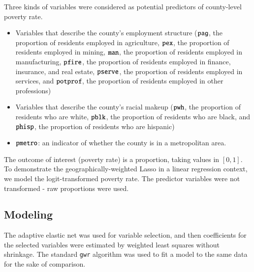 \documentclass[authoryear, review, 11pt]{elsarticle}
\begin{document}
	Three kinds of variables  were considered as potential predictors of county-level poverty rate.
	\begin{itemize}
		\item Variables that describe the county's employment structure ($\verb!pag!$, the proportion of residents employed in agriculture, $\verb!pex!$, the proportion of residents employed in mining, $\verb!man!$, the proportion of residents employed in manufacturing, $\verb!pfire!$, the proportion of residents employed in finance, insurance, and real estate, $\verb!pserve!$, the proportion of residents employed in services, and $\verb!potprof!$, the proportion of residents employed in other professions)\\
		\item Variables that describe the county's racial makeup ($\verb!pwh!$, the proportion of residents who are white, $\verb!pblk!$, the proportion of residents who are black, and $\verb!phisp!$, the proportion of residents who are hispanic)\\
		\item $\verb!pmetro!$: an indicator of whether the county is in a metropolitan area.
	\end{itemize}
	The outcome of interest (poverty rate) is a proportion, taking values in $[0,1]$. To demonstrate the geographically-weighted Lasso in a linear regression context, we model the logit-transformed poverty rate. The predictor variables were not transformed - raw proportions were used.
	
	\subsection{Modeling}	
	The adaptive elastic net was used for variable selection, and then coefficients for the selected variables were estimated by weighted least squares without shrinkage. The standard \verb!gwr! algorithm was used to fit a model to the same data for the sake of comparison.
	
\end{document}
